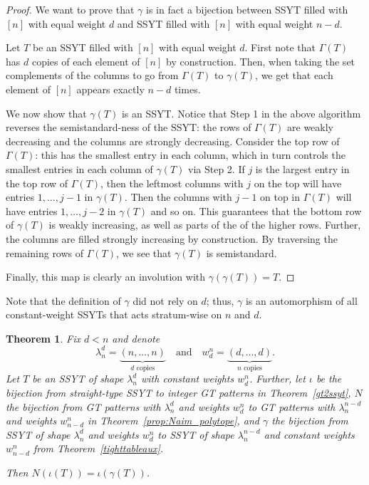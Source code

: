 \documentclass[10pt]{article}
\theoremstyle{plain}
\newtheorem{thm}{Theorem}[section]
\theoremstyle{definition}
\begin{document}
\begin{proof}
We want to prove that $\gamma$ is in fact a bijection between SSYT filled with $[n]$ with equal weight $d$ and SSYT filled with $[n]$ with equal weight $n-d$. 

Let $T$ be an SSYT filled with $[n]$ with equal weight $d$. First note that $\Gamma(T)$ has $d$ copies of each element of $[n]$ by construction.  Then, when taking the set complements of the columns to go from $\Gamma(T)$ to $\gamma(T)$, we get that each element of $[n]$ appears exactly $n-d$ times.

We now show that $\gamma(T)$ is an SSYT. Notice that Step 1 in the above algorithm reverses the semistandard-ness of the SSYT: the rows of $\Gamma(T)$ are weakly decreasing and the columns are strongly decreasing.  Consider the top row of $\Gamma(T)$: this has the smallest entry in each column, which in turn controls the smallest entries in each column of $\gamma(T)$ via Step 2.  If $j$ is the largest entry in the top row of $\Gamma(T)$, then the leftmost columns with $j$ on the top will have entries $1, \hdots, j-1$ in $\gamma(T)$.  Then the columns with $j-1$ on top in $\Gamma(T)$ will have entries $1, \hdots, j-2$ in $\gamma(T)$ and so on.  This guarantees that the bottom row of $\gamma(T)$ is weakly increasing, as well as parts of the of the higher rows.  Further, the columns are filled strongly increasing by construction.  By traversing the remaining rows of $\Gamma(T)$, we see that $\gamma(T)$ is semistandard.

Finally, this map is clearly an involution with $\gamma(\gamma(T))=T$.
\end{proof}
Note that the definition of $\gamma$ did not rely on $d$; thus, $\gamma$ is an automorphism of all constant-weight SSYTs that acts stratum-wise on $n$ and $d$.

\begin{thm}\label{thm:SSYTcompNai}
Fix $d < n$ and denote 
\[
\lambda_n^d=\underbrace{(n, \dots, n)}_{d \text{ copies}} \quad \textrm{and} \quad w_d^n =\underbrace{(d, \dots, d)}_{n \text{ copies}}.
\]
Let $T$ be an SSYT of shape $\lambda_n^d$ with constant weights $w_d^n$.  Further, let $\iota$ be the bijection from straight-type SSYT to integer GT patterns in Theorem~\ref{gt2ssyt}, $N$ the bijection from GT patterns with $\lambda_n^d$ and weights $w_d^n$ to GT patterns with $\lambda_n^{n-d}$ and weights $w_{n-d}^n$ in Theorem~\ref{prop:Naim_polytope}, and $\gamma$ the bijection from SSYT of shape $\lambda_n^d$ and weights $w_d^n$ to SSYT of shape $\lambda_n^{n-d}$ and constant weights $w_{n-d}^n$ from Theorem~\ref{tighttableaux}.

Then $N\left(\iota(T)\right) = \iota(\gamma(T))$.
\end{thm}
\end{document}
